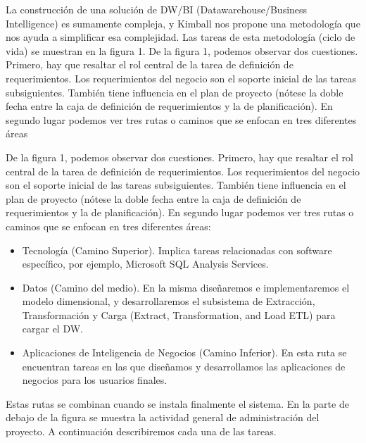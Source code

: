 \documentclass[preprint,12pt]{elsarticle}
\begin{document}
\begin{enumerate}[3.1]
La construcción de una solución de DW/BI (Datawarehouse/Business Intelligence) es sumamente compleja, y Kimball nos propone una metodología que nos ayuda a simplificar esa complejidad. Las tareas de esta metodología (ciclo de vida) se muestran en la figura 1. 
De la figura 1, podemos observar dos cuestiones. Primero, hay que resaltar el rol central de la tarea de definición de requerimientos. Los requerimientos del negocio son el soporte inicial de las tareas subsiguientes. También tiene influencia en el plan de proyecto (nótese la doble fecha entre la caja de definición de requerimientos y la de planificación). En segundo lugar podemos ver tres rutas o caminos que se enfocan en tres diferentes áreas


De la figura 1, podemos observar dos cuestiones. Primero, hay que resaltar el rol central de la tarea de definición de requerimientos.
Los requerimientos del negocio son el soporte inicial de las tareas subsiguientes. También tiene influencia en el plan de proyecto (nótese la doble fecha entre la caja de definición de requerimientos y la de planificación). En segundo lugar podemos ver tres rutas o caminos que se enfocan en tres diferentes áreas:\\

\begin{itemize}
  \item Tecnología (Camino Superior). Implica tareas relacionadas con software específico, por ejemplo, Microsoft SQL Analysis Services.
\\
  \item Datos (Camino del medio). En la misma diseñaremos e implementaremos el modelo dimensional, y desarrollaremos el subsistema de Extracción, Transformación y Carga (Extract, Transformation, and Load  ETL) para cargar el DW.
\\
  \item Aplicaciones de Inteligencia de Negocios (Camino Inferior). En esta ruta se encuentran tareas en las que diseñamos y desarrollamos las aplicaciones de negocios para los usuarios finales.
\\

\end{itemize} 
Estas rutas se combinan cuando se instala finalmente el sistema. En la parte de debajo de la figura se muestra la actividad general de administración del proyecto. A continuación describiremos cada una de las tareas. 
\end{enumerate}
\end{document}
